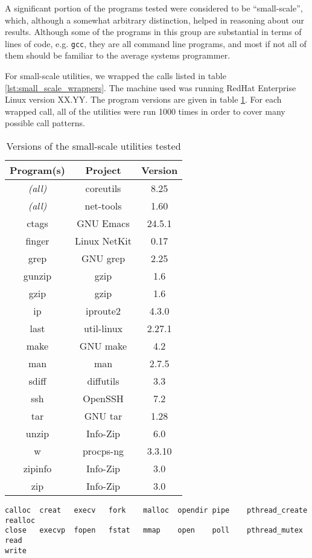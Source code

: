 A significant portion of the programs tested were considered to be ``small-scale'', which, although a somewhat arbitrary distinction, helped in reasoning about our results. Although some of the programs in this group are substantial in terms of lines of code, e.g. \texttt{gcc}, they are all command line programs, and most if not all of them should be familiar to the average systems programmer.

For small-scale utilities, we wrapped the calls listed in table \ref{lst:small_scale_wrappers}. The machine used was running RedHat Enterprise Linux version XX.YY. The program versions are given in table \ref{tab:small_scale_versions}. For each wrapped call, all of the utilities were run 1000 times in order to cover many possible call patterns.

\begin{table}[h!]
\begin{center}
\begin{tabular}{ |c|c|c| }
\hline
\multicolumn{1}{|c|}{\textbf{Program(s)}} & \multicolumn{1}{|c|}{\textbf{Project}} & \multicolumn{1}{c|}{\textbf{Version}} \\
\hline
\em{(all)} & coreutils  & 8.25 \\ 
\hline
\em{(all)} & net-tools & 1.60 \\
\hline
ctags&GNU Emacs & 24.5.1 \\
finger&Linux NetKit  & 0.17 \\
grep & GNU grep & 2.25 \\
gunzip & gzip & 1.6 \\
gzip & gzip & 1.6 \\
ip&iproute2 & 4.3.0 \\
last & util-linux & 2.27.1 \\
make & GNU make & 4.2 \\
man & man & 2.7.5 \\
sdiff&diffutils & 3.3 \\
ssh&OpenSSH & 7.2 \\
tar&GNU tar & 1.28 \\
unzip&Info-Zip  & 6.0 \\
w&procps-ng & 3.3.10 \\
zipinfo&Info-Zip & 3.0 \\
zip&Info-Zip & 3.0 \\
\hline
\end{tabular}
\caption{Versions of the small-scale utilities tested}
\label{tab:small_scale_versions}
\end{center}
\end{table}

\PreTable
\begin{lstlisting}[captionpos=b, label={lst:small_scale_wrappers},caption={Wrapped calls for testing small-scale utilities}]
calloc  creat   execv   fork    malloc  opendir pipe    pthread_create 	realloc
close   execvp  fopen   fstat   mmap    open    poll    pthread_mutex	read    
write
\end{lstlisting}
\PostTable

